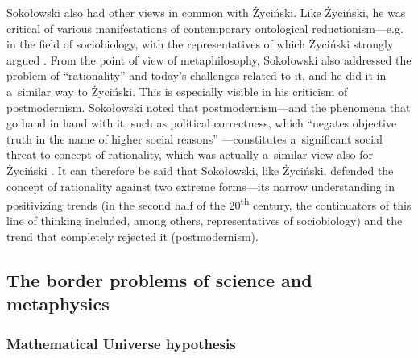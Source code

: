 \documentclass[%
  manuscript=article,
  year=2024,
  volume=77,
  doi=00000.000,
]{zfn}
\begin{document}
Sokołowski also had other views in common with Życiński. Like Życiński, he was critical of various manifestations of contemporary ontological reductionism---e.g. in the field of sociobiology, with the representatives of which Życiński strongly argued 
\parencites[][p.219]{Sokoowski2001Wspoczesne}[][pp.243–268]{Zycinski1993Granice}. %
 From the point of view of metaphilosophy, Sokołowski also addressed the problem of ``rationality'' and today's challenges related to it, and he did it in a~similar way to Życiński. This is especially visible in his criticism of postmodernism. Sokołowski noted that postmodernism---and the phenomena that go hand in hand with it, such as political correctness, which ``negates objective truth in the name of higher social reasons'' 
\parencite[][p.379]{Sokoowski2006Alicja}%
---constitutes a~significant social threat to concept of rationality, which was actually a~similar view also for Życiński 
\parencite[][]{Zycinski1994Postmodernistyczna}. %
 It can therefore be said that Sokołowski, like Życiński, defended the concept of rationality against two extreme forms---its narrow understanding in positivizing trends (in the second half of the 20\textsuperscript{th} century, the continuators of this line of thinking included, among others, representatives of sociobiology) and the trend that completely rejected it (postmodernism).



\subsection{ The border problems of science and metaphysics}



\subsubsection{Mathematical Universe hypothesis }
\end{document}
